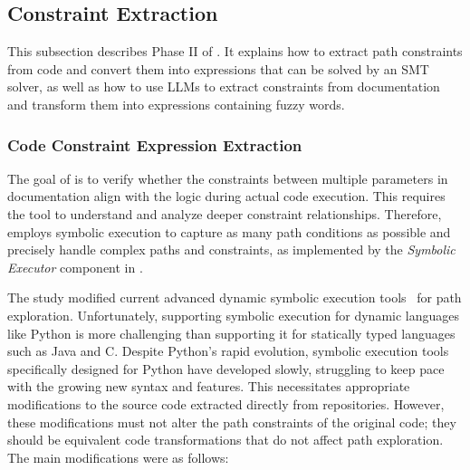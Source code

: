 \subsection{Constraint Extraction}\label{sec:extraction-mpchecker}

This subsection describes Phase II of . It explains how to extract path constraints from code and convert them into expressions that can be solved by an SMT solver, as well as how to use LLMs to extract constraints from documentation and transform them into expressions containing fuzzy words.

\subsubsection{Code Constraint Expression Extraction}\label{sec:code-extraction-mpchecker}

The goal of \toolchecker is to verify whether the constraints between multiple parameters in documentation align with the logic during actual code execution. This requires the tool to understand and analyze deeper constraint relationships. Therefore, \toolchecker employs symbolic execution to capture as many path conditions as possible and precisely handle complex paths and constraints, as implemented by the \textit{Symbolic Executor} component in .

The study modified current advanced dynamic symbolic execution tools~\cite{github:pyexsmt, github:pyexz3, github:pysmt, ball2015deconstructing, bruni2011peer} for path exploration. Unfortunately, supporting symbolic execution for dynamic languages like Python is more challenging than supporting it for statically typed languages such as Java and C. Despite Python's rapid evolution, symbolic execution tools specifically designed for Python have developed slowly, struggling to keep pace with the growing new syntax and features. This necessitates appropriate modifications to the source code extracted directly from repositories. However, these modifications must not alter the path constraints of the original code; they should be equivalent code transformations that do not affect path exploration. The main modifications were as follows:


